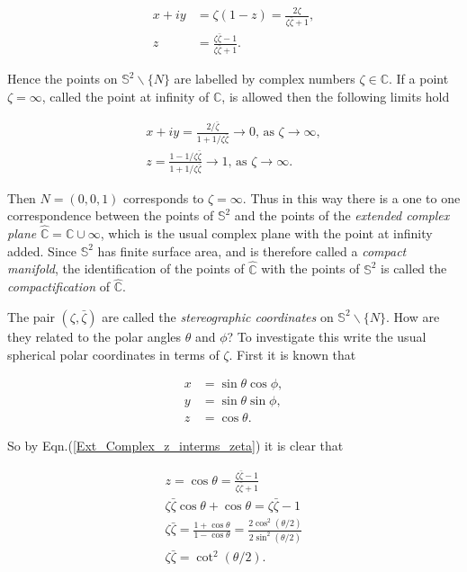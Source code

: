 \begin{align}\label{Ext_Complex_xy_interms_zeta}
x + iy & = \zeta (1-z) = \frac{2\zeta}{\zeta\bar{\zeta} + 1}, \\\label{Ext_Complex_z_interms_zeta}
z  & = \frac{\zeta\bar{\zeta} - 1}{\zeta\bar{\zeta} + 1}.
\end{align}

\noindent Hence the points on $\mathbb{S}^2 \backslash \{N\}$ are labelled by complex numbers $\zeta \in \mathbb{C}$. If a point $\zeta = \infty$, called the point at infinity of $\mathbb{C}$, is allowed then the following limits hold

\begin{eqnarray*}
x+ iy = \frac{2/\bar{\zeta}}{1 + 1/\zeta\bar{\zeta}} \rightarrow 0 \text{, as  } \zeta \rightarrow \infty, \\
z = \frac{1- 1/\zeta\bar{\zeta}}{1+ 1/\zeta\bar{\zeta}} \rightarrow 1 \text{, as  } \zeta \rightarrow \infty. 
\end{eqnarray*}

\noindent Then $N = (0,0,1)$ corresponds to $\zeta = \infty$. Thus in this way there is a one to one correspondence between the points of $\mathbb{S}^2$ and the points of the \textit{extended complex plane} $\hat{\mathbb{C}} = \mathbb{C} \cup {\infty}$, which is the usual complex plane with the point at infinity added. Since $\mathbb{S}^2$ has finite surface area, and is therefore called a \textit{compact manifold}, the identification of the points of $\hat{\mathbb{C}}$ with the points of $\mathbb{S}^2$ is called the \textit{compactification} of $\hat{\mathbb{C}}$.

The pair $(\zeta, \bar{\zeta})$ are called the \textit{stereographic coordinates} on $\mathbb{S}^2 \backslash \{N\}$. How are they related to the polar angles $\theta$ and $\phi$? To investigate this write the usual spherical polar coordinates in terms of $\zeta$. First it is known that

\begin{align*}
x & = \sin{\theta}\cos{\phi}, \\
y & = \sin{\theta}\sin{\phi}, \\
z & = \cos{\theta}.
\end{align*}

\noindent So by Eqn.(\ref{Ext_Complex_z_interms_zeta}) it is clear that

\begin{gather*}
z = \cos{\theta} = \frac{\zeta\bar{\zeta} - 1}{\zeta\bar{\zeta} + 1} \\
\zeta\bar{\zeta}\cos{\theta} + \cos{\theta} = \zeta\bar{\zeta} - 1\\
\zeta\bar{\zeta} = \frac{1 + \cos{\theta}}{1 - \cos{\theta}} = \frac{2\cos^2{\left(\theta/2\right)}}{2\sin^2{\left(\theta/2\right)}} \\
\zeta\bar{\zeta} = \cot^2{\left(\theta/2\right)}.
\end{gather*}

